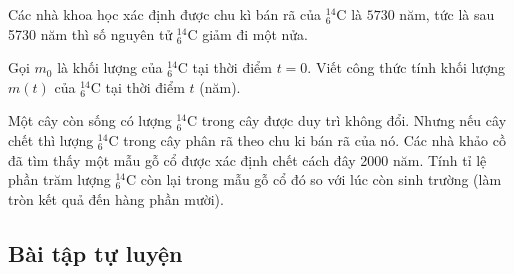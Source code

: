  \begin{vd}%
	Các nhà khoa học xác định được chu kì bán rã của ${ }_6^{14} \mathrm{C}$ là $5730$ năm, tức là sau 5730 năm thì số nguyên tử ${ }_6^{14} \mathrm{C}$ giảm đi một nửa.
	\begin{listEX}[1]
		\item Gọi $m_0$ là khối lượng của ${ }_6^{14} \mathrm{C}$ tại thời điểm $t=0$. Viết công thức tính khối lượng $m(t)$ của ${ }_6^{14} \mathrm{C}$ tại thời điểm $t$ (năm).
		\item Một cây còn sống có lượng ${ }_6^{14} \mathrm{C}$ trong cây được duy trì không đổi. Nhưng nếu cây chết thì lượng ${ }_6^{14} \mathrm{C}$ trong cây phân rã theo chu ki bán rã của nó. Các nhà khảo cồ đã tìm thấy một mẫu gỗ cổ được xác định chết cách đây 2000 năm. Tính tỉ lệ phần trăm lượng ${ }_6^{14} \mathrm{C}$ còn lại trong mẫu gỗ cổ đó so với lúc còn sinh trường (làm tròn kết quả đến hàng phần mười).
	\end{listEX}
\end{vd} 

\subsection{Bài tập tự luyện}

